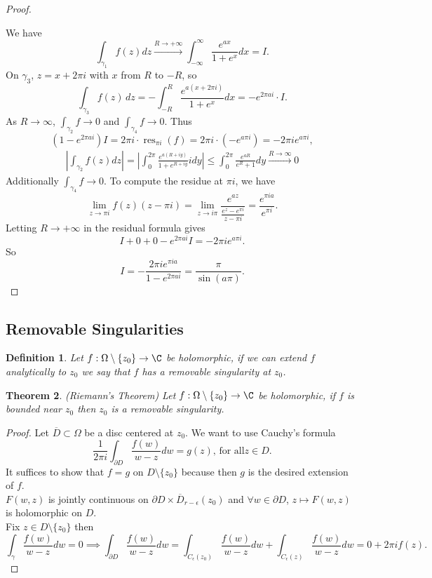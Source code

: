 \documentclass[a4paper]{article}
\newtheorem{thm}{Theorem}[section]
\newtheorem{defn}[thm]{Definition}
\begin{document}
\begin{proof}
\begin{center}
    \end{center}
    We have \[
    \int_{\gamma_1}f(z)dz \xrightarrow{R\to +\infty} \int_{-\infty}^\infty \frac{e^{ax}}{1+e^x}dx=I
    .\] 
    On $\gamma_3$, $z = x + 2\pi i$ with $x$ from $R$ to $-R$, so \[
    \int_{\gamma_3} f(z)\,dz = -\int_{-R}^{R} \frac{e^{a(x+2\pi i)}}{1+e^x}dx = -e^{2\pi a i}\cdot I.
    \] 
    As $R\to \infty$, $\int_{\gamma_2}f\to 0$ and $\int_{\gamma_4}f\to 0$. Thus \[
    (1-e^{2\pi a i})I = 2\pi i \cdot \operatorname{res}_{\pi i}(f) = 2\pi i \cdot (-e^{a\pi i}) = -2\pi i e^{a\pi i},
    \] 
    \begin{align*}
        \left |\int_{\gamma_2}f(z)dz \right |= \left |\int_0^{2\pi} \frac{e^{a(R+iy)}}{1+e^{R+iy}}idy \right |\leq \int_0^{2\pi} \frac{e^{aR}}{e^R+1}dy\xrightarrow{R\to \infty} 0
    \end{align*}
    Additionally $\int_{\gamma_4}f\to 0$. 
    To compute the residue at $\pi i$, we have \[
    \lim_{z\to \pi i}f(z)(z-\pi i)=\lim_{z\to i\pi}\frac{e^{az}}{\frac{e^z-e^{\pi i}}{z-\pi i}}=\frac{e^{\pi i a}}{e^{\pi i}}
    .\] 
    Letting $R\to +\infty$ in the residual formula gives \[
    I+0+0-e^{2\pi a i}I=-2\pi i e^{a\pi i}
    .\] 
    So \[
    I=-\frac{2\pi i e^{\pi i a}}{1-e^{2\pi a i}}=\frac{\pi}{\sin(a \pi)}
    .\] 
\end{proof}
\subsection{Removable Singularities}
\begin{defn}
    Let $f:\Omega\setminus \{z_0\}\to \C$ be holomorphic, if we can extend $f$ analytically to $z_0$ we say that $f$ has a removable singularity at $z_0$. 
\end{defn}
\begin{thm}
    (Riemann's Theorem) Let $f:\Omega\setminus \{z_0\}\to \C$ be holomorphic, if $f$ is bounded near $z_0$ then $z_0$ is a removable singularity. 
\end{thm}
\begin{proof}
    Let $\overline{D}\subset \Omega$ be a disc centered at $z_0$. We want to use Cauchy's formula \[
    \frac{1}{2\pi i}\int_{\partial D}\frac{f(w)}{w-z}dw = g(z) \text{, for all} z\in D
    .\] 
    It suffices to show that $f=g$ on $D\setminus \{z_0\}$ because then $g$ is the desired extension of $f$. \\
    $F(w,z)$ is jointly continuous on $\partial D \times \overline{D}_{r-\epsilon}(z_0)$ and $\forall w\in \partial D$, $z \mapsto F(w,z)$ is holomorphic on $D$. \\
    Fix $z\in D\setminus \{z_0\}$ then \[
    \int_\gamma \frac{f(w)}{w-z}dw=0 \implies \int_{\partial D}\frac{f(w)}{w-z}dw=\int_{C_\epsilon(z_0)}\frac{f(w)}{w-z}dw+\int_{C_\epsilon(z)}\frac{f(w)}{w-z}dw=0+2\pi i f(z)
    .\] 
\end{proof}
\newpage
\end{document}
